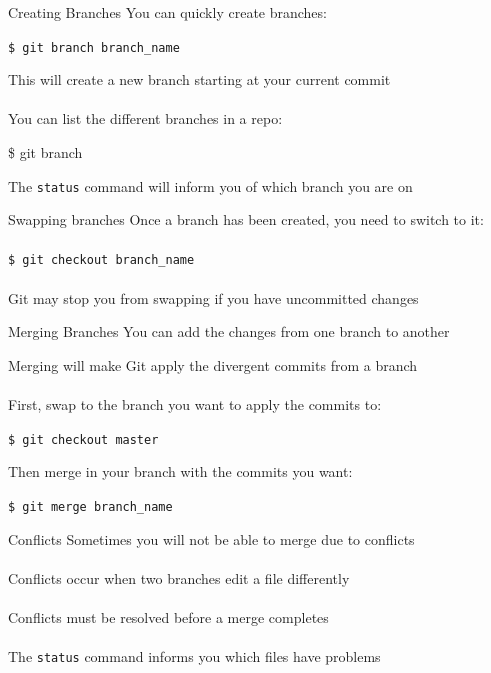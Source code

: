 \documentclass{beamer}
\begin{document}
\begin{frame}{Creating Branches}
    You can quickly create branches:

    {\tt \$ git branch branch\_name}

    This will create a new branch starting at your current commit\\~\\

    You can list the different branches in a repo:

    {\$ git branch}

    The {\tt status} command will inform you of which branch you are on
\end{frame}

\begin{frame}{Swapping branches}
    Once a branch has been created, you need to switch to it: \\~\\

    {\tt \$ git checkout branch\_name} \\~\\

    Git may stop you from swapping if you have uncommitted changes
\end{frame}

\begin{frame}{Merging Branches}
    You can add the changes from one branch to another

    Merging will make Git apply the divergent commits from a branch \\~\\

    First, swap to the branch you want to apply the commits to:

    {\tt \$ git checkout master}

    Then merge in your branch with the commits you want:

    {\tt \$ git merge branch\_name}
\end{frame}

\begin{frame}{Conflicts}
    Sometimes you will not be able to merge due to conflicts \\~\\

    Conflicts occur when two branches edit a file differently \\~\\

    Conflicts must be resolved before a merge completes \\~\\

    The {\tt status} command informs you which files have problems
\end{frame}
\end{document}
